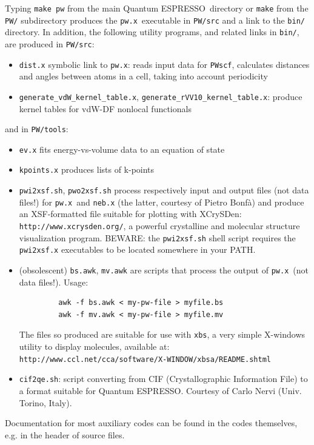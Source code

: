 \documentclass[12pt,a4paper]{article}
\def\PWscf{\texttt{PWscf}}
\def\qe{{\sc Quantum ESPRESSO}}
\def\pwx{\texttt{pw.x}}
\begin{document}
Typing \texttt{make pw} from the main \qe\ directory or
\texttt{make} from the \texttt{PW/} subdirectory produces
the \pwx\ executable in \texttt{PW/src} and a link to the
\texttt{bin/} directory. In addition, the following utility
programs, and related links in \texttt{bin/}, are produced
in \texttt{PW/src}:
\begin{itemize}
\item  \texttt{dist.x} symbolic link to \pwx: reads input data for \PWscf,
calculates distances and angles between atoms in a cell,
taking into account periodicity
\item  \texttt{generate\_vdW\_kernel\_table.x},
  \texttt{generate\_rVV10\_kernel\_table.x}: produce kernel tables for
  vdW-DF nonlocal functionals
\end{itemize}
and in \texttt{PW/tools}:
\begin{itemize}
\item  \texttt{ev.x} fits energy-vs-volume data to an equation of state
\item  \texttt{kpoints.x} produces lists of k-points
\item  \texttt{pwi2xsf.sh},  \texttt{pwo2xsf.sh} process respectively 
  input and output files (not data files!) for \pwx\ and \texttt{neb.x} 
  (the latter, courtesy of Pietro Bonf\`a) and produce an XSF-formatted file
  suitable for plotting with XCrySDen:
  \texttt{http://www.xcrysden.org/}, a powerful crystalline and
  molecular structure visualization program.
  BEWARE: the  \texttt{pwi2xsf.sh} shell script requires the
  \texttt{pwi2xsf.x} executables to be located somewhere in your PATH. 
\item (obsolescent) \texttt{bs.awk},  \texttt{mv.awk} are scripts that
  process the output of \pwx\ (not data files!). Usage: 
\begin{verbatim}
         awk -f bs.awk < my-pw-file > myfile.bs
         awk -f mv.awk < my-pw-file > myfile.mv
\end{verbatim}
The files so produced are suitable for use with  \texttt{xbs}, a very simple
X-windows utility to display molecules, available at:\\
 \texttt{http://www.ccl.net/cca/software/X-WINDOW/xbsa/README.shtml}
\item  \texttt{cif2qe.sh}: script converting from CIF 
(Crystallographic Information File) to a format suitable for \qe.
Courtesy of Carlo Nervi (Univ. Torino, Italy).
\end{itemize}
Documentation for most auxiliary codes can be found in the codes
themselves, e.g. in the header of source files.
\end{document}
